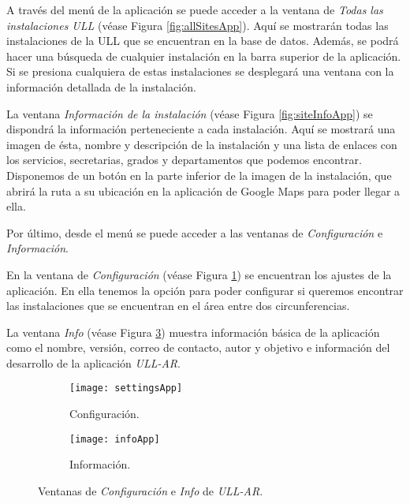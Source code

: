 \vskip 0.9in

A través del menú de la aplicación se puede acceder a la ventana de \textit{Todas las instalaciones ULL} (véase Figura \ref{fig:allSitesApp}). Aquí se mostrarán todas las instalaciones de la ULL que se encuentran en la base de datos. Además, se podrá hacer una búsqueda de cualquier instalación en la barra superior de la aplicación. Si se presiona cualquiera de estas instalaciones se  desplegará una ventana con la información detallada de la instalación.



La ventana \textit{Información de la instalación} (véase Figura \ref{fig:siteInfoApp}) se dispondrá la información perteneciente a cada instalación. Aquí se  mostrará una imagen de ésta, nombre y descripción de la instalación y una lista de enlaces con los servicios, secretarias, grados y departamentos que podemos encontrar. Disponemos de un botón en la parte inferior de la imagen de la instalación, que  abrirá la ruta a su ubicación en la aplicación de Google Maps para poder llegar a ella.  



Por último, desde el menú se puede acceder a las ventanas de \textit{Configuración} e \textit{Información}.

En la ventana de \textit{Configuración} (véase Figura \ref{fig:settingsApp}) se encuentran los ajustes de la aplicación. En ella tenemos la opción para poder configurar si queremos encontrar las instalaciones que se encuentran en el área entre dos circunferencias.

La ventana \textit{Info} (véase Figura \ref{fig:infoApp})  muestra información básica de la aplicación como el nombre, versión, correo de contacto, autor y objetivo e información del desarrollo de la aplicación \textit{ULL-AR}.  

\begin{figure}[h]
    \hspace*{\fill}%
    \begin{subfigure}[h]{0.35\linewidth}
    \texttt{[image: settingsApp]}
    \caption{Configuración.}
    \label{fig:settingsApp}
    \end{subfigure}
    \hfill%
    \begin{subfigure}[h]{0.35\linewidth}
    \texttt{[image: infoApp]}
    \caption{Información.}
    \label{fig:infoApp}
    \end{subfigure}%
    \caption{Ventanas de \textit{Configuración} e \textit{Info} de \textit{ULL-AR}.}
    \hspace*{\fill}%
\end{figure}


